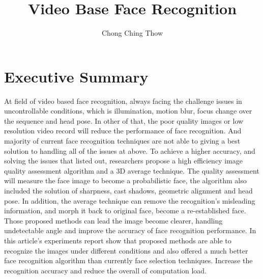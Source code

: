 \documentclass[12pt]{article}
\title{Video Base Face Recognition}
\author{Chong Ching Thow}
\date{}
\begin{document}
\maketitle


\tableofcontents
\clearpage

\section{Executive Summary}
At field of video based face recognition, always facing the challenge issues in uncontrollable conditions, which is illumination, motion blur, focus change over the sequence and head pose. In other of that, the poor quality images or low resolution video record will reduce the performance of face recognition. And majority of current face recognition techniques are not able to giving a best solution to handling all of the issues at above. To achieve a higher accuracy, and solving the issues that listed out, researchers propose a high efficiency image quality assessment algorithm and a 3D average technique. The quality assessment will measure the face image to become a probabilistic face, the algorithm also included the solution of sharpness, cast shadows, geometric alignment and head pose. In addition, the average technique can remove the recognition’s misleading information, and morph it back to original face, become a re-established face. Those proposed methods can lead the image become clearer, handling undetectable angle and improve the accuracy of face recognition performance. In this article’s experiments report show that proposed methods are able to recognize the images under different conditions and also offered a much better face recognition algorithm than currently face selection techniques. Increase the recognition accuracy and reduce the overall of computation load. 
\end{document}
